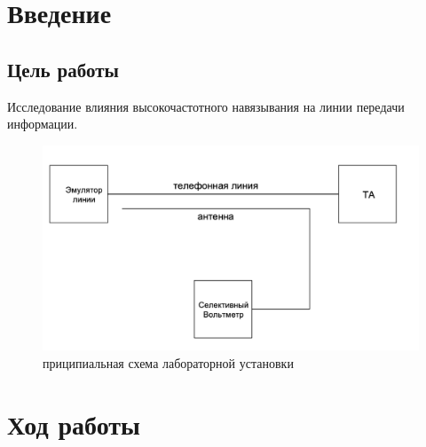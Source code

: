 \chapter{Введение}

\section{Цель работы}

Исследование влияния высокочастотного навязывания на линии передачи информации.

\begin{figure}
 \centering
 \includegraphics[width=.9\textwidth]{img/scheme.png}
 \caption{приципиальная схема лабораторной установки}
\end{figure}

\chapter{Ход работы}


